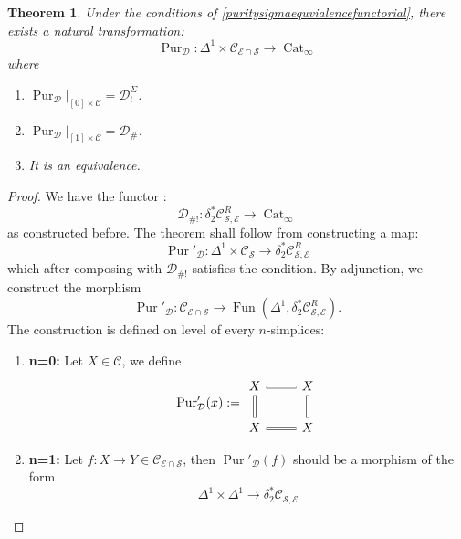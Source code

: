 \documentclass[14pt]{article}
\newtheorem{theorem}{Theorem}[subsection]
\theoremstyle{definition}
\newcommand{\E}{\mathcal{E}}
\newcommand{\D}{\mathcal{D}}
\newcommand{\op}[1]{\operatorname{#1}}
\renewcommand{\S}{\mathcal{S}}
\newcommand{\dd}{\delta}
\newcommand{\Ca}{\mathcal{C}}
\numberwithin{subsection}{section}
\begin{document}
\begin{theorem}\label{Theorem:PurityFunctorialFullForm}
Under the conditions of \cref{puritysigmaequvialencefunctorial}, there exists a natural transformation:
\begin{equation}
   \op{Pur}_{\D}: \Delta^1 \times \Ca_{\E \cap \S} \to \op{Cat}_{\infty}
\end{equation}
where 
\begin{enumerate}
    \item $\op{Pur}_{\D}|_{[0] \times \Ca} = \D^{\Sigma}_!$.
    \item $\op{Pur}_{\D}|_{[1] \times \Ca} = \D_{\#}$.
    \item It is an equivalence.
\end{enumerate}
\end{theorem}
\begin{proof}
 We have the functor :
 \begin{equation}
     \D_{\#!} : \dd^*_2\Ca^R_{\S,\E} \to \op{Cat}_{\infty}
 \end{equation}
  as constructed before. The theorem shall follow from constructing a map:
  \begin{equation}
      \op{Pur}'_{\D} : \Delta^1 \times \Ca_{\S}\to \dd^*_2\Ca^R_{\S,\E}
  \end{equation}
  which after composing with $\D_{\#!}$ satisfies the condition. By adjunction, we construct the morphism
  \begin{equation}
      \op{Pur}'_{\D}: \Ca_{\E \cap \S} \to \op{Fun}(\Delta^1,\dd^*_2\Ca^R_{\S,\E}).
  \end{equation}
The construction is defined on level of every $n$-simplices:
\begin{enumerate}
    \item \textbf{n=0:} Let $X \in \Ca$, we define 
    \begin{equation}
        \op{Pur}'_{\D}(x):= \begin{tikzcd}
            X \arrow[r,equal]  \arrow[d,equal] & X \arrow[d,equal] \\
            X \arrow[r,equal] & X
        \end{tikzcd}
    \end{equation}
    \item \textbf{n=1:} Let $f: X \to Y \in \Ca_{\E \cap \S}$, then $\op{Pur}'_{\D}(f)$ should be a morphism of the form
    \begin{equation}
        \Delta^1 \times \Delta^1 \to \dd^*_2\Ca_{\S,\E}
    \end{equation}


\end{enumerate}
\end{proof}
\end{document}
